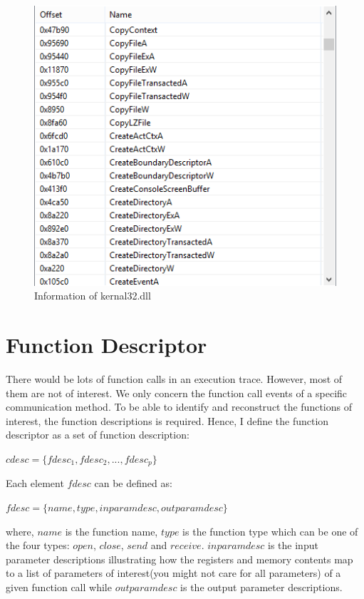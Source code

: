 \begin{figure}[H]
\centerline{\includegraphics[scale=0.6]{Figures/executable}}
\caption{Information of kernal32.dll}
\label{executable}
\end{figure}

\section{Function Descriptor}\label{cdesc}
There would be lots of function calls in an execution trace. However, most of them are not of interest. We only concern the function call events of a specific communication method. To be able to identify and reconstruct the functions of interest, the function descriptions is required. Hence, I define the function descriptor as a set of function description:

$cdesc = \lbrace fdesc_1, fdesc_2,...,fdesc_p \rbrace$

Each element $fdesc$ can be defined as:

$fdesc = \lbrace name, type, inparamdesc, outparamdesc \rbrace$

where, $name$ is the function name, $type$ is the function type which can be one of the four types: $open$, $close$, $send$ and $receive$. $inparamdesc$ is the input parameter descriptions illustrating how the registers and memory contents map to a list of parameters of interest(you might not care for all parameters) of a given function call while $outparamdesc$ is the output parameter descriptions. 

